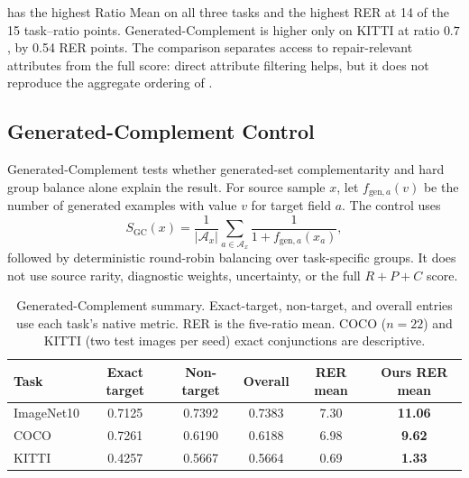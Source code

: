 \model has the highest Ratio Mean on all three tasks and the highest RER at 14 of the 15 task--ratio points. Generated-Complement is higher only on KITTI at ratio $0.7$, by 0.54 RER points. The comparison separates access to repair-relevant attributes from the full score: direct attribute filtering helps, but it does not reproduce the aggregate ordering of \model.

\subsection{Generated-Complement Control}

Generated-Complement tests whether generated-set complementarity and hard group balance alone explain the result. For source sample $x$, let $f_{\mathrm{gen},a}(v)$ be the number of generated examples with value $v$ for target field $a$. The control uses
\begin{equation}
S_{\mathrm{GC}}(x)=\frac{1}{|\mathcal A_x|}\sum_{a\in\mathcal A_x}\frac{1}{1+f_{\mathrm{gen},a}(x_a)},
\end{equation}
followed by deterministic round-robin balancing over task-specific groups. It does not use source rarity, diagnostic weights, uncertainty, or the full $R+P+C$ score.

\begin{table}[t]
\centering
\caption{Generated-Complement summary. Exact-target, non-target, and overall entries use each task's native metric. RER is the five-ratio mean. COCO ($n=22$) and KITTI (two test images per seed) exact conjunctions are descriptive.}
\label{tab:generated-complement-summary}
\small
\setlength{\tabcolsep}{5pt}
\begin{tabular}{l c c c c c}
\toprule
\rowcolor{sectiongray} \textbf{Task} & \textbf{Exact target} & \textbf{Non-target} & \textbf{Overall} & \textbf{RER mean} & \textbf{Ours RER mean} \\
\midrule
ImageNet10 & 0.7125 & 0.7392 & 0.7383 & 7.30 & \textbf{11.06} \\
COCO & 0.7261 & 0.6190 & 0.6188 & 6.98 & \textbf{9.62} \\
KITTI & 0.4257 & 0.5667 & 0.5664 & 0.69 & \textbf{1.33} \\
\bottomrule
\end{tabular}
\end{table}

